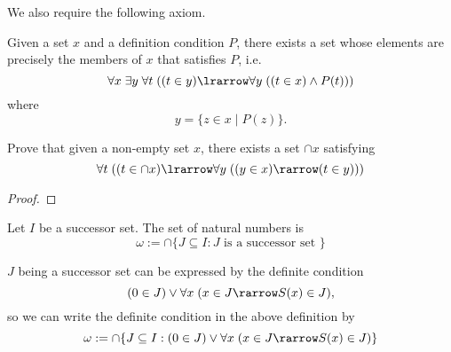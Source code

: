\documentclass[notoc,notitlepage]{tufte-book}
\begin{document}
We also require the following axiom.

\begin{axiom}
\label{axiom:bounded_separation_axiom}
Given a set $x$ and a definition condition $P$, there exists a set whose elements are precisely the members of $x$ that satisfies $P$, i.e.
  \begin{equation*}
    \forall x \; \exists y \; \forall t \; ( ( t \in y ) \lrarrow \forall y \; ( ( t \in x ) \land P(t) ) )
  \end{equation*}
  where
  \begin{equation*}
    y = \{ z \in x \mid P(z) \}.
  \end{equation*}
\end{axiom}

\begin{ex}
  Prove that given a non-empty set $x$, there exists a set $\cap x$ satisfying
  \begin{equation*}
    \forall t \; ( ( t \in \cap x ) \lrarrow \forall y \; ( ( y \in x ) \rarrow (t \in y) ) )
  \end{equation*}
\end{ex}

\begin{proof}
\end{proof}

\begin{defn}
\label{defn:natural_numbers}
Let $I$ be a successor set. The set of natural numbers is
  \begin{equation*}
    \omega := \cap \{ J \subseteq I : J \text{ is a successor set } \}
  \end{equation*}
\end{defn}

\begin{note}
  $J$ being a successor set can be expressed by the definite condition
  \begin{equation*}
    ( 0 \in J ) \lor \forall x \; ( x \in J \rarrow S(x) \in J ),
  \end{equation*}
  so we can write the definite condition in the above definition by
  \begin{equation*}
    \omega := \cap \{ J \subseteq I : ( 0 \in J ) \lor \forall x \; ( x \in J \rarrow S(x) \in J ) \}
  \end{equation*}
\end{note}
\end{document}
